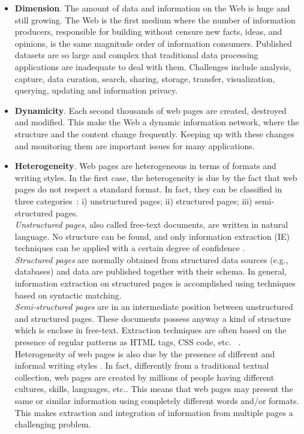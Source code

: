 \begin{itemize}
\item \textbf{Dimension}. The amount of data and information on the Web is huge and still growing. The Web is the first medium where the number of information producers, responsible for building without censure new facts, ideas, and opinions, is the same magnitude order of information consumers. Published datasets are so large and complex that traditional data processing applications are inadequate to deal with them. Challenges include analysis, capture, data curation, search, sharing, storage, transfer, visualization, querying, updating and information privacy. 
\item \textbf{Dynamicity}. Each second thousands of web pages are created, destroyed and modified. This make the Web a dynamic information network, where
 the structure and the content change frequently. Keeping up with these changes and monitoring them are important issues for many applications. 
\item \textbf{Heterogeneity}. Web pages are heterogeneous in terms of formats and writing styles. In the first case, the heterogeneity is due by the fact that web pages do not respect a standard format. In fact, they can be classified in three categories~\cite{Chang:2006}: i) unstructured pages; ii) structured pages; iii) semi-structured pages. \\
\textit{Unstructured pages}, also called free-text documents, are written in natural language. No structure can be found, and only information extraction (IE) techniques can be applied with a certain degree of confidence \cite{Sarawagi:2008}. \\
\textit{Structured pages} are normally obtained from structured data sources (e.g., databases) and data are published together with their schema. %
In general, information extraction on structured pages is accomplished using techniques based on syntactic matching. \\
\textit{Semi-structured pages} are in an intermediate position between unstructured and structured pages. These documents possess anyway a kind of structure which is enclose in free-text. Extraction techniques are often based on the presence of regular patterns as HTML tags, CSS code, etc. ~\cite{Ferrara:2012}.\\
Heterogeneity of web pages is also due by the presence of different and informal writing styles \cite{Liu:2006, Kim:2012}. In fact, differently from a traditional textual collection, web pages are created by millions of people having different cultures, skills, languages, etc.. This means that web pages may present the same or similar information using completely different words and/or formats. This makes extraction and integration of information from multiple pages a challenging problem. 


\end{itemize}
